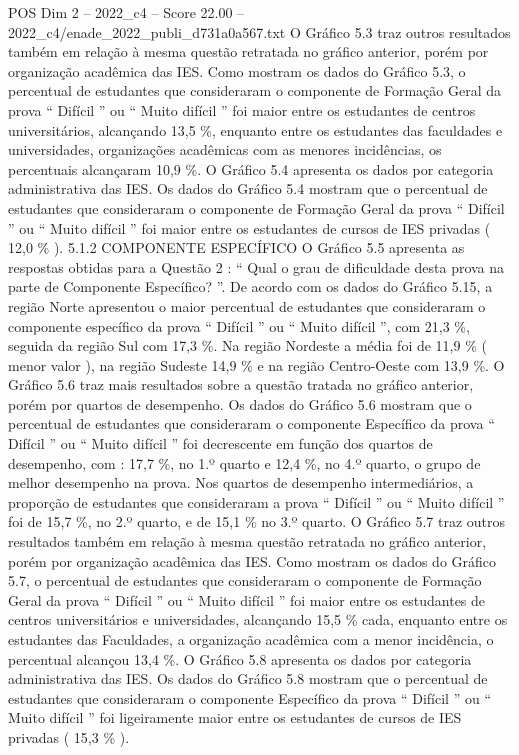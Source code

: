 \begin{textsample}{POS Dim 2 – 2022\_c4 – Score 22.00 – 2022\_c4/enade\_2022\_publi\_d731a0a567.txt}
O Gráfico 5.3 traz outros resultados também em relação à mesma questão retratada no gráfico anterior, porém por organização acadêmica das IES.
Como mostram os dados do Gráfico 5.3, o percentual de estudantes que consideraram o componente de Formação Geral da prova “ Difícil ” ou “ Muito difícil ” foi maior entre os estudantes de centros universitários, alcançando 13,5 \%, enquanto entre os estudantes das faculdades e universidades, organizações acadêmicas com as menores incidências, os percentuais alcançaram 10,9 \%.
O Gráfico 5.4 apresenta os dados por categoria administrativa das IES.
Os dados do Gráfico 5.4 mostram que o percentual de estudantes que consideraram o componente de Formação Geral da prova “ Difícil ” ou “ Muito difícil ” foi maior entre os estudantes de cursos de IES privadas ( 12,0 \% ). 5.1.2 COMPONENTE ESPECÍFICO O Gráfico 5.5 apresenta as respostas obtidas para a Questão 2 : “ Qual o grau de dificuldade desta prova na parte de Componente Específico? ”.
De acordo com os dados do Gráfico 5.15, a região Norte apresentou o maior percentual de estudantes que consideraram o componente específico da prova “ Difícil ” ou “ Muito difícil ”, com 21,3 \%, seguida da região Sul com 17,3 \%.
Na região Nordeste a média foi de 11,9 \% ( menor valor ), na região Sudeste 14,9 \% e na região Centro-Oeste com 13,9 \%.
O Gráfico 5.6 traz mais resultados sobre a questão tratada no gráfico anterior, porém por quartos de desempenho.
Os dados do Gráfico 5.6 mostram que o percentual de estudantes que consideraram o componente Específico da prova “ Difícil ” ou “ Muito difícil ” foi decrescente em função dos quartos de desempenho, com : 17,7 \%, no 1.º quarto e 12,4 \%, no 4.º quarto, o grupo de melhor desempenho na prova.
Nos quartos de desempenho intermediários, a proporção de estudantes que consideraram a prova “ Difícil ” ou “ Muito difícil ” foi de 15,7 \%, no 2.º quarto, e de 15,1 \% no 3.º quarto.
O Gráfico 5.7 traz outros resultados também em relação à mesma questão retratada no gráfico anterior, porém por organização acadêmica das IES.
Como mostram os dados do Gráfico 5.7, o percentual de estudantes que consideraram o componente de Formação Geral da prova “ Difícil ” ou “ Muito difícil ” foi maior entre os estudantes de centros universitários e universidades, alcançando 15,5 \% cada, enquanto entre os estudantes das Faculdades, a organização acadêmica com a menor incidência, o percentual alcançou 13,4 \%.
O Gráfico 5.8 apresenta os dados por categoria administrativa das IES.
Os dados do Gráfico 5.8 mostram que o percentual de estudantes que consideraram o componente Específico da prova “ Difícil ” ou “ Muito difícil ” foi ligeiramente maior entre os estudantes de cursos de IES privadas ( 15,3 \% ).

\end{textsample}
